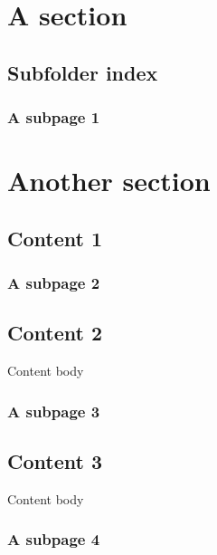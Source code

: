

\pagestyle{empty}
\sphinxmaketitle
\pagestyle{plain}
\sphinxtableofcontents
\pagestyle{normal}
\label{\detokenize{index::doc}}


\sphinxAtStartPar
{}


\part{A section}


\chapter{Subfolder index}
\label{\detokenize{subfolder/index:subfolder-index}}\label{\detokenize{subfolder/index::doc}}
\sphinxAtStartPar
{}


\section{A subpage 1}
\label{\detokenize{subfolder/asubpage1:a-subpage-1}}\label{\detokenize{subfolder/asubpage1::doc}}

\part{Another section}


\chapter{Content 1}
\label{\detokenize{content1:content-1}}\label{\detokenize{content1::doc}}

\section{A subpage 2}
\label{\detokenize{subfolder/asubpage2:a-subpage-2}}\label{\detokenize{subfolder/asubpage2::doc}}

\chapter{Content 2}
\label{\detokenize{content2:content-2}}\label{\detokenize{content2::doc}}
\sphinxAtStartPar
Content body


\section{A subpage 3}
\label{\detokenize{subfolder/asubpage3:a-subpage-3}}\label{\detokenize{subfolder/asubpage3::doc}}

\chapter{Content 3}
\label{\detokenize{content3:content-3}}\label{\detokenize{content3::doc}}
\sphinxAtStartPar
Content body


\section{A subpage 4}
\label{\detokenize{subfolder/asubpage4:a-subpage-4}}\label{\detokenize{subfolder/asubpage4::doc}}






\renewcommand{\indexname}{Index}
\printindex
